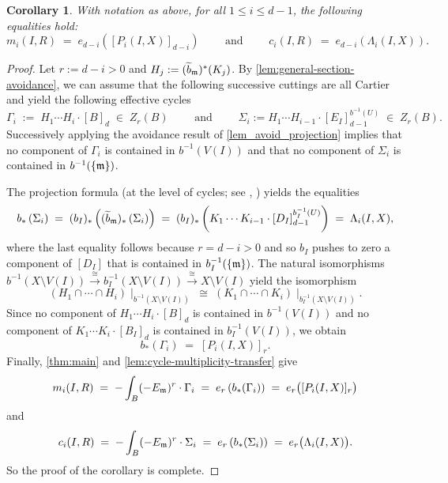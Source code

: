 \documentclass[a4paper, 11pt]{amsart}
\newcommand{\mm}{{\normalfont\mathfrak{m}}}
\newtheorem{corollary}[corollary]{Corollary}
\theoremstyle{definition}
\begin{document}
	\begin{corollary}
		\label{cor:cycle-multiplicities}
		With notation as above, for all $1\leq i\leq d-1$, the following equalities hold:
		$$
		m_i(I,R) \;=\; e_{d-i}\left([P_i(I,X)]_{d-i}\right) \qquad \text{ and } \qquad
		c_i(I,R) \;=\; e_{d-i}\left(\Lambda_i(I,X)\right).
		$$
	\end{corollary}
	\begin{proof}
		Let $r:=d-i>0$ and $H_j:=(\widetilde{b}_\mm)^*(K_j)$.
		By \autoref{lem:general-section-avoidance}, we can assume that the following successive cuttings are all Cartier and yield the following effective cycles
		$$
		\Gamma_i \;:=\; H_1\cdots H_i\cdot[B]_d \;\in\; Z_r(B)
		\qquad \text{ and } \qquad
		\Sigma_i:=H_1\cdots H_{i-1}\cdot[E_I]_{d-1}^{b^{-1}(U)}
		\;\in\; Z_r(B).
		$$
		Successively applying the avoidance result of \autoref{lem_avoid_projection} implies that no component of $\Gamma_i$ is contained in $b^{-1}(V(I))$ and that no component of $\Sigma_i$ is contained in $b^{-1}(\{\mm\})$.
		
		The projection formula (at the level of cycles; see \cite[Proposition 1.4]{Fu}, \cite[\href{https://stacks.math.columbia.edu/tag/02RT}{Tag 02RT}]{stacks-project}) yields the equalities
		\begin{align*}
			b_*\left(\Sigma_i\right) \;=\; (b_I)_*\left((\widetilde{b}_\mm)_*\left(\Sigma_i\right)\right) 
			\;=\; (b_I)_*\left(K_1 \cdots K_{i-1} \cdot \left[D_I\right]_{d-1}^{b_I^{-1}(U)}\right) 
			\;=\; \Lambda_i(I, X),
		\end{align*}
		where the last equality follows because $r = d-i > 0$ and so $b_I$ pushes to zero a component of $[D_I]$ that is contained in $b_I^{-1}(\{\mm\})$.
		The natural isomorphisms $b^{-1}(X \setminus V(I)) \xrightarrow{\;\cong\;} b_I^{-1}(X \setminus V(I)) \xrightarrow{\;\cong\;} X \setminus V(I)$ yield the isomorphism
		$$
		\left(H_1 \cap \cdots \cap H_i\right)\mid_{b^{-1}(X \setminus V(I))} \;\cong\; \left(K_1 \cap \cdots \cap K_i\right)\mid_{b_I^{-1}(X \setminus V(I))}.
		$$
		Since no component of $H_1\cdots H_i\cdot[B]_d$ is contained in $b^{-1}(V(I))$ and no component of $K_1\cdots K_i \cdot \left[B_I\right]_d$ is contained in $b_I^{-1}(V(I))$, we obtain 
		$$
		b_*\left(\Gamma_i\right) \;=\; [P_i(I,X)]_r.
		$$
		Finally, \autoref{thm:main} and
		\autoref{lem:cycle-multiplicity-transfer} give
		$$
		m_i(I,R)
		\;=\;-\int_B(-E_\mm)^r\cdot\Gamma_i
		\;=\;e_r\left(b_*(\Gamma_i)\right)
		\;=\;e_r\bigl([P_i(I,X)]_r\bigr)
		$$
		and 
		$$
		c_i(I,R)
		\;=\;-\int_B(-E_\mm)^r\cdot\Sigma_i
		\;=\;e_r\left(b_*(\Sigma_i)\right)
		\;=\;e_r\bigl(\Lambda_i(I,X)\bigr).
		$$
		So the proof of the corollary is complete. 
	\end{proof}
	
\end{document}
